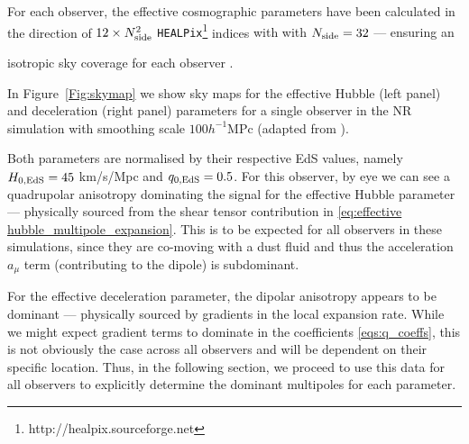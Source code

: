 \documentclass[fleqn,usenatbib]{mnras}
\begin{document}
For each observer, the effective cosmographic parameters have been calculated {in the direction of}
$12\times N_{\rm side}^2$ 
{\tt HEALPix}\footnote{http://healpix.sourceforge.net} indices {with with $N_{\rm side}=32$ --- ensuring an } 

isotropic sky coverage for each observer \citep{healpy2}. %

{In} {Figure~\ref{Fig:skymap} {we show}} %
sky maps for the %
effective Hubble (left panel) and deceleration (right panel) parameters for a single observer in the NR simulation with smoothing scale {$100 h^{-1}$MPc}  (adapted from ). 
{Both parameters are normalised by their {respective} EdS
{values, namely $H_{0,{\rm EdS}}=45$ km/s/Mpc and $q_{0,{\rm EdS}}=0.5$. }
{For} this %
observer, %
by eye we can see a quadrupolar anisotropy dominating the signal {for the effective Hubble parameter --- physically} sourced from the shear tensor contribution in \eqref{eq:effective hubble_multipole_expansion}. {This is to be expected for all observers in these simulations, since they are co-moving with a dust fluid and thus the acceleration $a_\mu$ term (contributing to the dipole) is subdominant.}

For the effective deceleration parameter, %
the dipolar %
anisotropy appears to be dominant --- physically sourced by gradients in the local expansion rate. While we might expect gradient terms to dominate in the coefficients \eqref{eqs:q_coeffs}, this is not obviously the case across all observers and will be dependent on their specific location. 
{Thus, in the following section, we proceed to use this data for all observers to explicitly determine the dominant multipoles for each parameter. }




}
\end{document}
